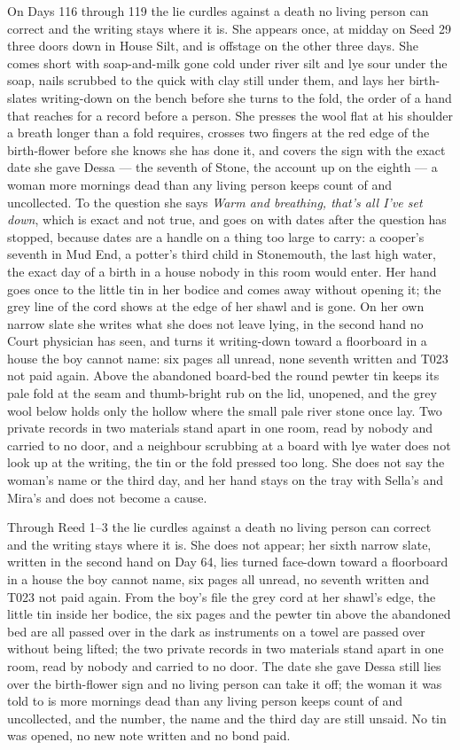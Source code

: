 \documentclass{design/chronicle}
\begin{document}
{On Days 116 through 119 the lie curdles against a death no living person can correct and the writing stays where it is. She appears once, at midday on Seed 29 three doors down in House Silt, and is offstage on the other three days. She comes short with soap-and-milk gone cold under river silt and lye sour under the soap, nails scrubbed to the quick with clay still under them, and lays her birth-slates writing-down on the bench before she turns to the fold, the order of a hand that reaches for a record before a person. She presses the wool flat at his shoulder a breath longer than a fold requires, crosses two fingers at the red edge of the birth-flower before she knows she has done it, and covers the sign with the exact date she gave Dessa — the seventh of Stone, the account up on the eighth — a woman more mornings dead than any living person keeps count of and uncollected. To the question she says \emph{Warm and breathing, that’s all I’ve set down}, which is exact and not true, and goes on with dates after the question has stopped, because dates are a handle on a thing too large to carry: a cooper’s seventh in Mud End, a potter’s third child in Stonemouth, the last high water, the exact day of a birth in a house nobody in this room would enter. Her hand goes once to the little tin in her bodice and comes away without opening it; the grey line of the cord shows at the edge of her shawl and is gone. On her own narrow slate she writes what she does not leave lying, in the second hand no Court physician has seen, and turns it writing-down toward a floorboard in a house the boy cannot name: six pages all unread, none seventh written and T023 not paid again. Above the abandoned board-bed the round pewter tin keeps its pale fold at the seam and thumb-bright rub on the lid, unopened, and the grey wool below holds only the hollow where the small pale river stone once lay. Two private records in two materials stand apart in one room, read by nobody and carried to no door, and a neighbour scrubbing at a board with lye water does not look up at the writing, the tin or the fold pressed too long. She does not say the woman’s name or the third day, and her hand stays on the tray with Sella’s and Mira’s and does not become a cause.

Through Reed 1–3 the lie curdles against a death no living person can correct and the writing stays where it is. She does not appear; her sixth narrow slate, written in the second hand on Day 64, lies turned face-down toward a floorboard in a house the boy cannot name, six pages all unread, no seventh written and T023 not paid again. From the boy’s file the grey cord at her shawl’s edge, the little tin inside her bodice, the six pages and the pewter tin above the abandoned bed are all passed over in the dark as instruments on a towel are passed over without being lifted; the two private records in two materials stand apart in one room, read by nobody and carried to no door. The date she gave Dessa still lies over the birth-flower sign and no living person can take it off; the woman it was told to is more mornings dead than any living person keeps count of and uncollected, and the number, the name and the third day are still unsaid. No tin was opened, no new note written and no bond paid.

}
\end{document}
